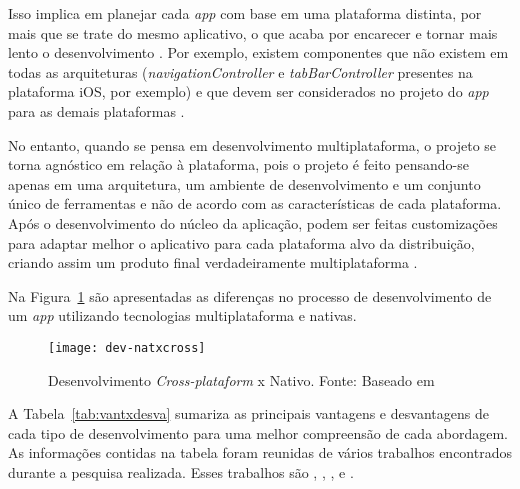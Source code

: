 Isso implica em planejar cada \textit{app} com base em uma plataforma distinta, por mais que se trate do mesmo aplicativo, o que acaba por encarecer 
e tornar mais lento o desenvolvimento \cite{kassas_taxonomy_2015}. Por exemplo, existem componentes que não existem em todas as arquiteturas (\textit{navigationController} e 
\textit{tabBarController} presentes na plataforma iOS, por exemplo) e que devem ser considerados no projeto do \textit{app} para as demais plataformas \cite{shakshuki_4th_2013}.

No entanto, quando se pensa em desenvolvimento multiplataforma, o projeto se torna agnóstico em relação à plataforma, pois o projeto é feito pensando-se 
apenas em uma arquitetura, um ambiente de desenvolvimento e um conjunto único de ferramentas e não de acordo com as características de cada plataforma. Após o desenvolvimento do núcleo da
aplicação, podem ser feitas customizações para adaptar melhor o aplicativo para cada plataforma alvo da distribuição, criando assim um produto final verdadeiramente multiplataforma \cite{corral_ant_2012}.

Na Figura~\ref{fig:dev-natxcross} são apresentadas as diferenças no processo de desenvolvimento de um \textit{app} utilizando tecnologias multiplataforma e 
nativas.

\begin{figure}[H]
  \centering
    \texttt{[image: dev-natxcross]}
    \caption[Desenvolvimento Multiplataforma (acima) e Nativo (abaixo)]{ Desenvolvimento \textit{Cross-plataform} x Nativo. Fonte: Baseado em \cite{corral_ant_2012}}
	\label{fig:dev-natxcross}
\end{figure}

A Tabela~\ref{tab:vantxdesva} sumariza as principais vantagens e desvantagens de cada tipo de desenvolvimento para uma melhor compreensão de cada abordagem. 
As informações contidas na tabela foram reunidas de vários trabalhos encontrados durante a pesquisa realizada. Esses trabalhos são , 
, ,  e . 

